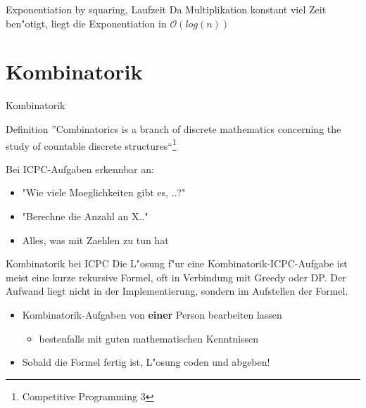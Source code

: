 \documentclass[18pt]{beamer}
\begin{document}
\begin{algorithm}
\scriptsize 
\caption{Exponentiation(n, x) (rekursiv)}
\begin{algorithmic}
\ENDIF
{}
\ENDIF
{}
\ELSE
{}
\ENDIF
\ENDWHILE
\end{algorithmic}
\end{algorithm}

\begin{frame} {Exponentiation by squaring, Laufzeit}
Da Multiplikation konstant viel Zeit ben"otigt, liegt die Exponentiation in $\mathcal{O}(log(n))$
\end{frame}


\section{Kombinatorik}


\begin{frame}{Kombinatorik}
\begin{block}{Definition}
	''Combinatorics is a branch of discrete mathematics concerning the study of countable discrete structures``\footnote{Competitive Programming 3}
\end{block}

Bei ICPC-Aufgaben erkennbar an:
\begin{itemize}
	\item "Wie viele Moeglichkeiten gibt es, ..?"
	\item "Berechne die Anzahl an X.."
	\item Alles, was mit Zaehlen zu tun hat
\end{itemize}
\end{frame}

\begin{frame}{Kombinatorik bei ICPC}
Die L"osung f"ur eine Kombinatorik-ICPC-Aufgabe ist meist eine kurze rekursive Formel, oft in Verbindung mit Greedy oder DP. Der Aufwand liegt nicht in der Implementierung, sondern im Aufstellen der Formel.
\begin{itemize}
\item Kombinatorik-Aufgaben von \textbf{einer} Person bearbeiten lassen

\begin{itemize}
\item bestenfalls mit guten mathematischen Kenntnissen
\end{itemize}

\item Sobald die Formel fertig ist, L"osung coden und abgeben!
\end{itemize}
\end{frame}
\end{document}
